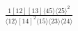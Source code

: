 \documentclass[varwidth, border=5pt]{standalone}
\begin{document}
\begin{my}
$\begin{gathered}
\scriptscriptstyle\frac{1[12][13]⟨45⟩⟨25⟩^2}{⟨12⟩[14]^2⟨15⟩⟨23⟩⟨24⟩}
\end{gathered}$
\end{my}
\end{document}
